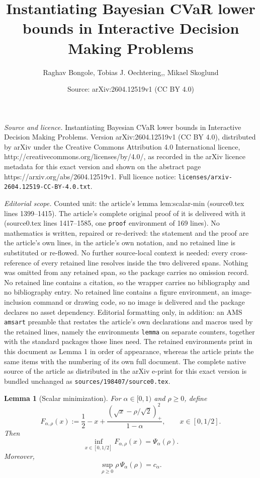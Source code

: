 \documentclass[10pt,a4paper]{amsart}
\title{Instantiating Bayesian CVaR lower bounds in Interactive Decision Making Problems}
\author{Raghav Bongole, Tobias J. Oechtering,, Mikael Skoglund}
\date{Source: arXiv:2604.12519v1 (CC BY 4.0)}
\newtheorem{lemma}{Lemma}
\begin{document}
\maketitle

\noindent\emph{Source and licence.} Instantiating Bayesian CVaR lower bounds in Interactive Decision Making Problems. Version arXiv:2604.12519v1 (CC BY 4.0), distributed by arXiv under the Creative Commons Attribution 4.0 International licence, http://creativecommons.org/licenses/by/4.0/, as recorded in the arXiv licence metadata for this exact version and shown on the abstract page https://arxiv.org/abs/2604.12519v1. Full licence notice: \texttt{licenses/arxiv-2604.12519-CC-BY-4.0.txt}.\par\smallskip

\noindent\textit{Editorial scope.} Counted unit: the article's lemma lem:scalar-min (source0.tex lines 1399--1415). The article's complete original proof of it is delivered with it (source0.tex lines 1417--1585, one \texttt{proof} environment of 169 lines). No mathematics is written, repaired or re-derived: the statement and the proof are the article's own lines, in the article's own notation, and no retained line is substituted or re-flowed.  No further source-local context is needed: every cross-reference of every retained line resolves inside the two delivered spans.  Nothing was omitted from any retained span, so the package carries no omission record.  No retained line contains a citation, so the wrapper carries no bibliography and no bibliography entry.  No retained line contains a figure environment, an image-inclusion command or drawing code, so no image is delivered and the package declares no asset dependency.  Editorial formatting only, in addition: an AMS \texttt{amsart} preamble that restates the article's own declarations and macros used by the retained lines, namely the environments \texttt{lemma} on separate counters, together with the standard packages those lines need.  The retained environments print in this document as Lemma 1 in order of appearance, whereas the article prints the same items with the numbering of its own full document.  The complete native source of the article as distributed in the arXiv e-print for this exact version is bundled unchanged as \texttt{sources/198407/source0.tex}.
\begin{lemma}[Scalar minimization]
\label{lem:scalar-min}
For \(\alpha\in[0,1)\) and \(\rho\ge 0\), define
\[
F_{\alpha,\rho}(x):=
\frac12-x+\frac{(\sqrt{x}-\rho/\sqrt2)_+^2}{1-\alpha},
\qquad x\in[0,1/2].
\]
Then
\[
\inf_{x\in[0,1/2]}F_{\alpha,\rho}(x)=\Psi_\alpha(\rho).
\]
Moreover,
\[
\sup_{\rho\ge 0}\rho\,\Psi_\alpha(\rho)=c_\alpha.
\]
\end{lemma}
\end{document}
